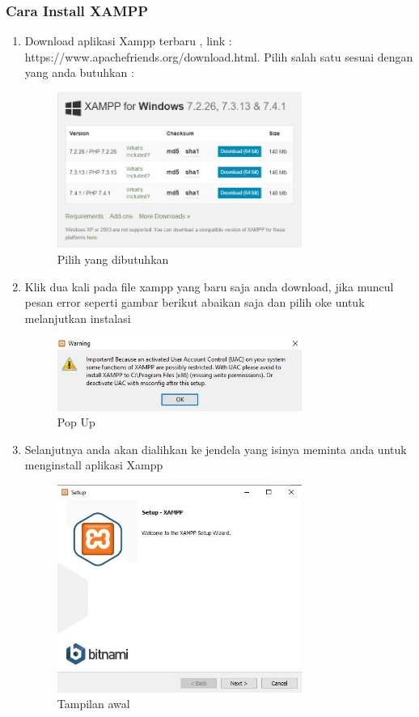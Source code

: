 \subsubsection{Cara Install XAMPP}
\begin{enumerate}
\item Download aplikasi Xampp terbaru , link : https://www.apachefriends.org/download.html. Pilih salah satu sesuai dengan yang anda butuhkan :
	\begin{figure}[H]
		\includegraphics[width=8cm]{figures/instalasi/xampp.jpg}
		\centering
		\caption{Pilih yang dibutuhkan}
	\end{figure}
	
\item Klik dua kali pada file xampp yang baru saja anda download, jika muncul pesan error seperti gambar berikut abaikan saja dan pilih oke untuk melanjutkan instalasi
	\begin{figure}[H]
		\includegraphics[width=8cm]{figures/instalasi/xampp2.jpg}
		\centering
		\caption{Pop Up}
	\end{figure}
	
\item Selanjutnya anda akan dialihkan ke jendela yang isinya meminta anda untuk menginstall aplikasi Xampp 
	\begin{figure}[H]
		\includegraphics[width=8cm]{figures/instalasi/xampp3.jpg}
		\centering
		\caption{Tampilan awal}
	\end{figure}


\end{enumerate}
